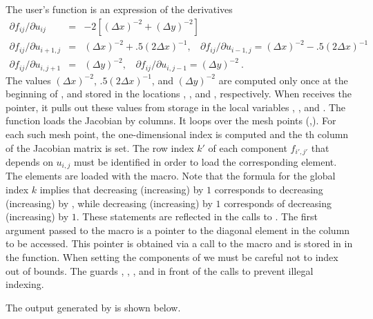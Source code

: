 The user's  function is an expression of the derivatives
\begin{eqnarray*}
\partial f_{ij} / \partial u_{ij} &=&
         -2 [(\Delta x)^{-2} + (\Delta y)^{-2}] \\
\partial f_{ij} / \partial u_{i+1,j} &=& (\Delta x)^{-2} 
                  + .5 (2 \Delta x)^{-1}, ~~~~
\partial f_{ij} / \partial u_{i-1,j}  =  (\Delta x)^{-2} 
                  - .5 (2 \Delta x)^{-1} \\
\partial f_{ij} / \partial u_{i,j+1} &=& (\Delta y)^{-2}, ~~~~
\partial f_{ij} / \partial u_{i,j-1}  =  (\Delta y)^{-2} ~. 
\end{eqnarray*}
The values $(\Delta x)^{-2}$, $.5(2 \Delta x)^{-1}$, and 
$(\Delta y)^{-2}$  are computed only once at the beginning of 
, and stored in the locations , 
, and ,
respectively. 
When  receives the  pointer, it pulls out these
values from storage in the local variables , , and
. The  function loads the Jacobian by columns.  
It loops over the mesh points (,). For each such mesh
point, the one-dimensional index  is computed
and the th column of the Jacobian matrix  is set. 
The row index $k'$ of each component $f_{i',j'}$ that depends on
$u_{i,j}$ must be identified in order to load the corresponding element.
The elements are loaded with the  macro.
Note that the formula for the global index $k$ implies that decreasing 
(increasing)  by $1$ corresponds to decreasing (increasing) 
 by , while decreasing (increasing)  by $1$ 
corresponds of decreasing (increasing)  by $1$. 
These statements are reflected in the calls to
. The first argument passed to the 
 macro is a pointer to the diagonal element 
in the column to be accessed. This pointer is obtained via a call to 
the  macro and is stored in  in
the  function. When setting the components of  we must be
careful not to index out of bounds. The guards ,
, , and  in front of the
calls to  prevent illegal
indexing.

The output generated by  is shown below.


